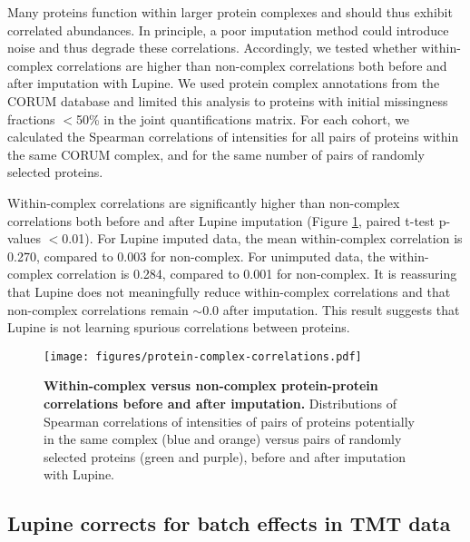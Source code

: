 \documentclass{article}
\begin{document}
Many proteins function within larger protein complexes and should thus exhibit correlated abundances. In principle, a poor imputation method could introduce noise and thus degrade these correlations.  Accordingly, we tested whether within-complex correlations are higher than non-complex correlations both before and after imputation with Lupine. We used protein complex annotations from the CORUM \cite{corum} database and limited this analysis to proteins with initial missingness fractions $<$50\% in the joint quantifications matrix. For each cohort, we calculated the Spearman correlations of intensities for all pairs of proteins within the same CORUM complex, and for the same number of pairs of randomly selected proteins. 

Within-complex correlations are significantly higher than non-complex correlations both before and after Lupine imputation (Figure \ref{fig:complex-correlations}, paired t-test p-values $<$0.01). For Lupine imputed data, the mean within-complex correlation is 0.270, compared to 0.003 for non-complex. For unimputed data, the within-complex correlation is 0.284, compared to 0.001 for non-complex. It is reassuring that Lupine does not meaningfully reduce within-complex correlations and that non-complex correlations remain $\sim$0.0 after imputation. This result suggests that Lupine is not learning spurious correlations between proteins. 


\begin{figure}
  \centering
  \texttt{[image: figures/protein-complex-correlations.pdf]}
  \caption{{\bf Within-complex versus non-complex protein-protein correlations before and after imputation.} 
  Distributions of Spearman correlations of intensities of pairs of proteins potentially in the same complex (blue and orange) versus pairs of randomly selected proteins (green and purple), before and after imputation with Lupine.} 
  \label{fig:complex-correlations}
\end{figure} 

\subsection{Lupine corrects for batch effects in TMT data}
\end{document}
